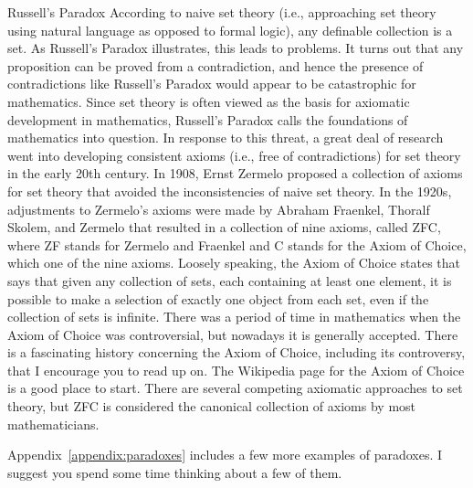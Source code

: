 \begin{section}{Russell's Paradox}
According to naive set theory (i.e., approaching set theory using natural language as opposed to formal logic), any definable collection is a set. As Russell's Paradox illustrates, this leads to problems.  It turns out that any proposition can be proved from a contradiction, and hence the presence of contradictions like Russell's Paradox would appear to be catastrophic for mathematics.  Since set theory is often viewed as the basis for axiomatic development in mathematics, Russell's Paradox calls the foundations of mathematics into question. In response to this threat, a great deal of research went into developing consistent axioms (i.e., free of contradictions) for set theory in the early 20th century. In 1908, Ernst Zermelo proposed a collection of axioms for set theory that avoided the inconsistencies of naive set theory. In the 1920s, adjustments to Zermelo's axioms were made by Abraham Fraenkel, Thoralf Skolem, and Zermelo that resulted in a collection of nine axioms, called ZFC, where ZF stands for Zermelo and Fraenkel and C stands for the Axiom of Choice, which one of the nine axioms. Loosely speaking, the Axiom of Choice states that says that given any collection of sets, each containing at least one element, it is possible to make a selection of exactly one object from each set, even if the collection of sets is infinite. There was a period of time in mathematics when the Axiom of Choice was controversial, but nowadays it is generally accepted.  There is a fascinating history concerning the Axiom of Choice, including its controversy, that I encourage you to read up on.  The Wikipedia page for the Axiom of Choice is a good place to start. There are several competing axiomatic approaches to set theory, but ZFC is considered the canonical collection of axioms by most mathematicians.

Appendix~\ref{appendix:paradoxes} includes a few more examples of paradoxes.  I suggest you spend some time thinking about a few of them.

\end{section}